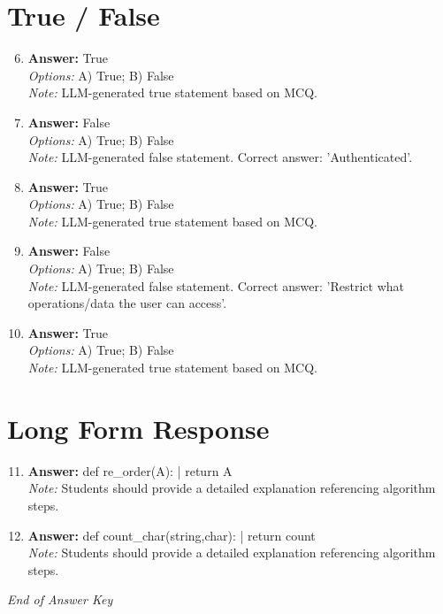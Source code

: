 \documentclass[12pt]{article}
\begin{document}
\section*{True / False}
\begin{enumerate}[label=\arabic*.]
\setcounter{enumi}{5}
\item \textbf{Answer:} True
\\ \textit{Options:} A) True; B) False
\\ \textit{Note:} LLM-generated true statement based on MCQ.
\item \textbf{Answer:} False
\\ \textit{Options:} A) True; B) False
\\ \textit{Note:} LLM-generated false statement. Correct answer: 'Authenticated'.
\item \textbf{Answer:} True
\\ \textit{Options:} A) True; B) False
\\ \textit{Note:} LLM-generated true statement based on MCQ.
\item \textbf{Answer:} False
\\ \textit{Options:} A) True; B) False
\\ \textit{Note:} LLM-generated false statement. Correct answer: 'Restrict what operations/data the user can access'.
\item \textbf{Answer:} True
\\ \textit{Options:} A) True; B) False
\\ \textit{Note:} LLM-generated true statement based on MCQ.
\end{enumerate}

\section*{Long Form Response}
\begin{enumerate}[label=\arabic*.]
\setcounter{enumi}{10}
\item \textbf{Answer:} def re\_order(A): | return A
\\ \textit{Note:} Students should provide a detailed explanation referencing algorithm steps.
\item \textbf{Answer:} def count\_char(string,char): | return count
\\ \textit{Note:} Students should provide a detailed explanation referencing algorithm steps.
\end{enumerate}

\vfill
\noindent\textit{End of Answer Key}
\end{document}
